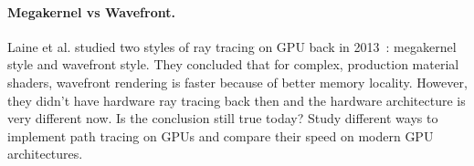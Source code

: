 \paragraph{Megakernel vs Wavefront.}
Laine et al. studied two styles of ray tracing on GPU back in 2013~\cite{Laine:2013:MCH}: megakernel style and wavefront style. They concluded that for complex, production material shaders, wavefront rendering is faster because of better memory locality. However, they didn't have hardware ray tracing back then and the hardware architecture is very different now. Is the conclusion still true today? Study different ways to implement path tracing on GPUs and compare their speed on modern GPU architectures.





